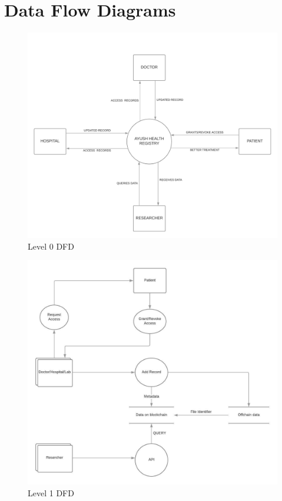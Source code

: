 \documentclass[11pt]{report}
\begin{document}
\newpage
\section{Data Flow Diagrams}
    \begin{figure}[h!]
        \centering
        \includegraphics[scale=0.6]{DFD0.jpeg}
        \caption{Level 0 DFD}
        \label{fig:my_label}
    \end{figure}
    \begin{figure}[h!]
        \centering
        \includegraphics[scale=0.9]{DFD1.jpg}
        \caption{Level 1 DFD}
        \label{fig:my_label}
    \end{figure}
\end{document}
